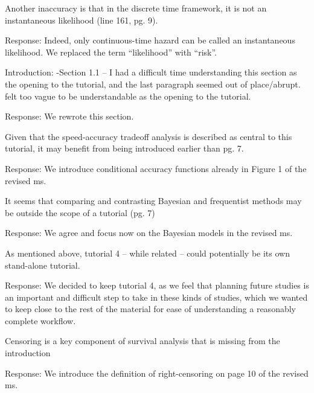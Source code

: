 \documentclass[
]{article}
\renewenvironment{quote}{\begin{leftbar}}{\end{leftbar}}
\begin{document}
\begin{quote}
Another inaccuracy is that in the discrete time framework, it is not an
instantaneous likelihood (line 161, pg. 9).
\end{quote}

Response: Indeed, only continuous-time hazard can be called an
instantaneous likelihood. We replaced the term ``likelihood'' with
``risk''.

\begin{quote}
Introduction: -Section 1.1 -- I had a difficult time understanding this
section as the opening to the tutorial, and the last paragraph seemed
out of place/abrupt. felt too vague to be understandable as the opening
to the tutorial.
\end{quote}

Response: We rewrote this section.

\begin{quote}
Given that the speed-accuracy tradeoff analysis is described as central
to this tutorial, it may benefit from being introduced earlier than pg.
7.
\end{quote}

Response: We introduce conditional accuracy functions already in Figure
1 of the revised ms.

\begin{quote}
It seems that comparing and contrasting Bayesian and frequentist methods
may be outside the scope of a tutorial (pg. 7)
\end{quote}

Response: We agree and focus now on the Bayesian models in the revised
ms.

\begin{quote}
As mentioned above, tutorial 4 -- while related -- could potentially be
its own stand-alone tutorial.
\end{quote}

Response: We decided to keep tutorial 4, as we feel that planning future
studies is an important and difficult step to take in these kinds of
studies, which we wanted to keep close to the rest of the material for
ease of understanding a reasonably complete workflow.

\begin{quote}
Censoring is a key component of survival analysis that is missing from
the introduction
\end{quote}

Response: We introduce the definition of right-censoring on page 10 of
the revised ms.
\end{document}

